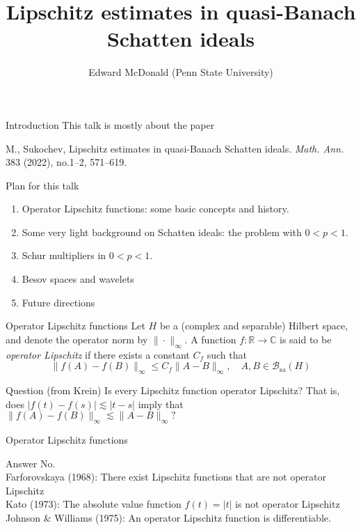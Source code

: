 \documentclass{beamer}
\newcommand\makebeamertitle{\frame{\maketitle}}%
\numberwithin{equation}{section}
\theoremstyle{plain}
\theoremstyle{plain}
\theoremstyle{definition}
\theoremstyle{plain}
\theoremstyle{plain}
\theoremstyle{definition}
\newcommand{\Rl}{\mathbb{R}}
\newcommand{\Cplx}{\mathbb{C}}
\newcommand{\Bc}{\mathcal{B}}
\newcommand{\sa}{\mathrm{sa}}
\begin{document}
\title[Lipschitz estimates for $p<1$]{Lipschitz estimates in quasi-Banach Schatten ideals}


\author[E. McDonald]{Edward McDonald (Penn State University)}





\makebeamertitle


\begin{frame}{Introduction}
This talk is mostly about the paper
\begin{center}
M., Sukochev, Lipschitz estimates in quasi-Banach Schatten ideals.
\emph{Math. Ann.} 383 (2022), no.1--2, 571--619.
\end{center}
\end{frame}

\begin{frame}{Plan for this talk}
    \begin{enumerate}
        \item{} Operator Lipschitz functions: some basic concepts and history.
        \item{} Some very light background on Schatten ideals: the problem with $0<p<1.$
        \item{} Schur multipliers in $0<p<1.$
        \item{} Besov spaces and wavelets
        \item{} Future directions
    \end{enumerate}
\end{frame}

\begin{frame}{Operator Lipschitz functions}
    Let $H$ be a (complex and separable) Hilbert space, and denote
    the operator norm by $\|\cdot\|_\infty$. A function $f:\Rl\to \Cplx$
    is said to be \emph{operator Lipschitz} if there exists a constant $C_f$ such that
    \begin{equation*}
        \|f(A)-f(B)\|_\infty \leq C_f\|A-B\|_\infty,\quad A,B\in \Bc_{\sa}(H)
    \end{equation*}
    \begin{block}{Question (from Krein)}
        Is every Lipschitz function operator Lipschitz?
        \pause
        That is, does $|f(t)-f(s)|\lesssim |t-s|$ imply that $\|f(A)-f(B)\|_{\infty} \lesssim \|A-B\|_{\infty}?$
    \end{block}
\end{frame}


\begin{frame}{Operator Lipschitz functions}
    \begin{block}{Answer}
        No.\\\pause
        Farforovskaya (1968): There exist Lipschitz functions that are not operator Lipschitz\\\pause
        Kato (1973): The absolute value function $f(t) = |t|$ is not operator Lipschitz\\\pause
        Johnson \& Williams (1975): An operator Lipschitz function is differentiable.
    \end{block}
\end{frame}
\end{document}
